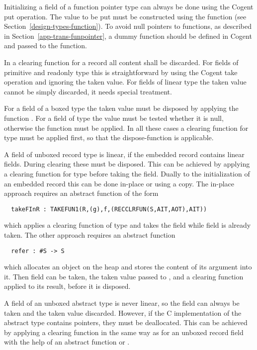 Initializing a field  of a function pointer type  can always be done using the Cogent put operation.
The value to be put must be constructed using the function  (see Section~\ref{design-types-function}). To
avoid null pointers to functions, as described in Section~\ref{app-trans-funpointer}, a dummy function should be defined in
Cogent and passed to the  function.

In a clearing function for a record all content shall be discarded. For fields of primitive and readonly type this is
straightforward by using the Cogent take operation and ignoring the taken value. For fields of linear type the taken value
cannot be simply discarded, it needs special treatment.

For a field of a boxed type  the taken value must be disposed by applying the function .
For a field of type
 the value must be tested whether it is null, otherwise the function  must be applied. In
all these cases a clearing function for type  must be applied first, so that the dispose-function is applicable.

A field of unboxed record type  is linear, if the embedded record contains linear fields. During clearing these must be
disposed. This can be achieved by applying a clearing function for type  before taking the field. Dually to the 
initialization of an embedded record this can be done in-place or using a copy. The in-place approach requires an abstract
function of the form
\begin{verbatim}
  takeFInR : TAKEFUN1(R,(g),f,(RECCLRFUN(S,AIT,AOT),AIT))
\end{verbatim}
which applies a clearing function of type  and takes the field  while field  is already taken.
The other approach requires an abstract function 
\begin{verbatim}
  refer : #S -> S
\end{verbatim}
which allocates an object on the heap and stores the content of its argument into it. Then field  can be taken, the taken
value passed to , and a clearing function applied to its result, before it is disposed.

A field of an unboxed abstract type is never linear, so the field can always be taken and the taken value discarded.
However, if the C implementation of the abstract type contains pointers, they must be deallocated. This can be achieved by
applying a clearing function in the same way as for an unboxed record field with the help of an abstract function
 or .

